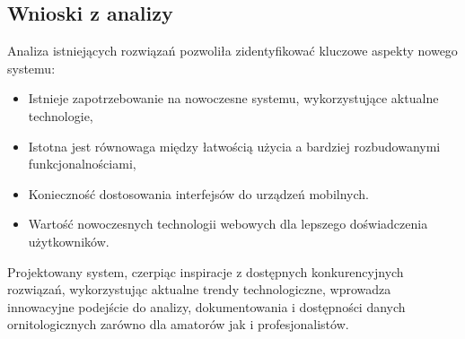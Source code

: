 \subsection{Wnioski z analizy}
Analiza istniejących rozwiązań pozwoliła zidentyfikować kluczowe aspekty nowego systemu:
\begin{itemize}
	\item Istnieje zapotrzebowanie na nowoczesne systemu, wykorzystujące aktualne technologie,
	\item Istotna jest równowaga między łatwością użycia a bardziej rozbudowanymi funkcjonalnościami,
	\item Konieczność dostosowania interfejsów do urządzeń mobilnych.
	\item Wartość nowoczesnych technologii webowych dla lepszego doświadczenia użytkowników.
\end{itemize}

Projektowany system, czerpiąc inspiracje z dostępnych konkurencyjnych rozwiązań, wykorzystując aktualne trendy technologiczne, wprowadza innowacyjne podejście do analizy, dokumentowania i dostępności danych ornitologicznych zarówno dla amatorów jak i profesjonalistów.
